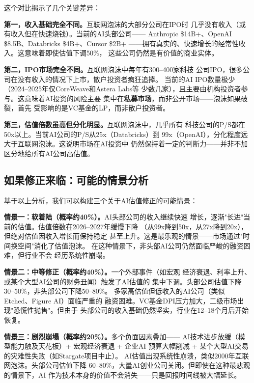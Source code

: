 这个对比揭示了几个关键差异：

\textbf{第一，收入基础完全不同。}互联网泡沫的大部分公司在IPO时
几乎没有收入（或有收入但在快速烧钱）。当前的AI头部公司——
Anthropic \$14B+、OpenAI \$8.5B、Databricks \$4B+、Cursor \$2B+
——拥有真实的、快速增长的经常性收入。这意味着即使估值下调50\%，
这些公司仍然是有价值的商业实体。

\textbf{第二，IPO市场完全不同。}互联网泡沫中每年有300--400家科技
公司IPO，很多公司在没有收入的情况下上市，散户投资者疯狂追捧。
当前的AI IPO数量极少（2024--2025年仅CoreWeave和Astera Labs等
少数几家），且主要由机构投资者参与。这意味着AI投资的风险主要
集中在\textbf{私募市场}，而非公开市场——泡沫如果破裂，首先
受影响的是VC基金的LP，而非散户投资者。

\textbf{第三，估值倍数虽高但分化明显。}互联网泡沫中，几乎所有
科技公司的P/S都在50x以上。当前AI公司的P/S从25x（Databricks）到
99x（OpenAI），分化程度远大于互联网泡沫。这说明市场在AI投资中
仍然保持着一定的判断力——并非不加区分地给所有AI公司高估值。

\subsection{如果修正来临：可能的情景分析}
\label{subsec:fund-scenarios}

基于以上分析，我们可以构建三个关于AI估值修正的可能情景：

\textbf{情景一：软着陆（概率约40\%）。}AI头部公司的收入继续快速
增长，逐渐"长进"当前的估值。估值倍数在2026--2027年缓慢下降
（从99x降到50x，从27x降到20x），但绝对估值因收入增长而保持稳定
甚至上升。这是最乐观的情景——市场通过"时间换空间"消化了估值泡沫。
在这种情景下，非头部AI公司仍然面临严峻的融资困难，但行业不会
经历系统性崩塌。

\textbf{情景二：中等修正（概率约40\%）。}一个外部事件（如宏观
经济衰退、利率上升、或某个大型AI公司的财务丑闻）触发了AI估值的
集中下调。头部公司估值下降30--50\%，非头部公司下降50--80\%。
多家高估值但低收入的AI公司（类似Etched、Figure AI）面临严重的
融资困难。VC基金DPI压力加大，二级市场出现"恐慌性抛售"。但由于
头部公司的收入基础仍然坚实，行业在12--18个月后开始恢复。

\textbf{情景三：剧烈崩塌（概率约20\%）。}多个负面因素叠加——
AI技术进步放缓（模型能力触及天花板）+ 宏观经济衰退 + 企业AI
预算大幅削减 + 某个大型AI交易的灾难性失败（如Stargate项目中止）。
AI估值出现系统性崩溃，类似2000年互联网泡沫。头部公司估值下降
60--80\%，大量AI创业公司关闭。但即使在这种最悲观的情景下，AI
作为技术本身的价值不会消失——只是回报时间线被大幅延长。

